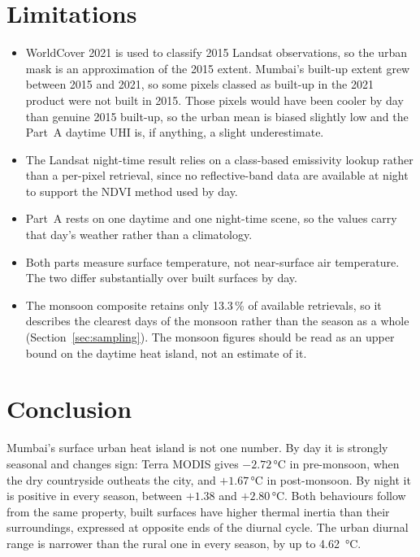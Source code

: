 \documentclass[11pt,a4paper]{article}
\begin{document}
\section{Limitations}

\begin{itemize}
  \item WorldCover 2021 is used to classify 2015 Landsat observations,
        so the urban mask is an approximation of the 2015 extent.
        Mumbai's built-up extent grew between 2015 and 2021, so some
        pixels classed as built-up in the 2021 product were not built
        in 2015. Those pixels would have been cooler by day than
        genuine 2015 built-up, so the urban mean is biased slightly
        low and the Part~A daytime UHI is, if anything, a slight
        underestimate.
  \item The Landsat night-time result relies on a class-based
        emissivity lookup rather than a per-pixel retrieval, since no
        reflective-band data are available at night to support the
        NDVI method used by day.
  \item Part~A rests on one daytime and one night-time scene, so the
        values carry that day's weather rather than a climatology.
  \item Both parts measure surface temperature, not near-surface air
        temperature. The two differ substantially over built surfaces
        by day.
  \item The monsoon
composite retains only 13.3\,\% of available retrievals, so it
describes the clearest days of the monsoon rather than the season as
a whole (Section~\ref{sec:sampling}). The monsoon figures should be
read as an upper bound on the daytime heat island, not an estimate of
it.
\end{itemize}

\section{Conclusion}

Mumbai's surface urban heat island
is not one number. By day it is strongly seasonal and changes sign:
Terra MODIS gives $-2.72$\,\si{\degreeCelsius} in pre-monsoon, when
the dry countryside outheats the city, and $+1.67$\,\si{\degreeCelsius}
in post-monsoon. By night it is positive in every season, between
$+1.38$ and $+2.80$\,\si{\degreeCelsius}. Both behaviours follow from
the same property, built surfaces have higher thermal inertia than
their surroundings, expressed at opposite ends of the diurnal
cycle. The urban diurnal range is narrower than the rural one in every
season, by up to \SI{4.62}{\degreeCelsius}.
\end{document}
